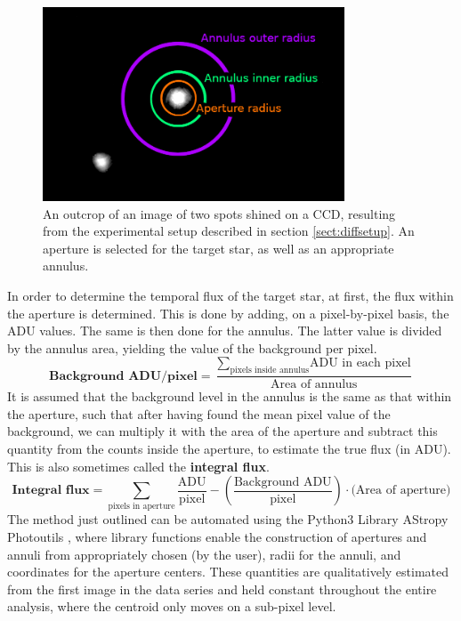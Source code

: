 \documentclass[../main.tex]{subfiles}
\begin{document}
\begin{figure}[h!]
	\centering
	\includegraphics[width	=0.8\textwidth]{aperturespots.png}
	\caption{An outcrop of an image of two spots shined on a CCD, resulting from the experimental setup described in section \ref{sect:diffsetup}. An aperture is selected for the target star, as well as an appropriate annulus.}
	\label{fig:aperture}
\end{figure}

In order to determine the temporal flux of the target star, at first, the flux within the aperture is determined. This is done by adding, on a pixel-by-pixel basis, the ADU values. The same is then done for the annulus. The latter value is divided by the annulus area, yielding the value of the background per pixel. 
\begin{equation}
	\textbf{Background ADU/pixel} = \frac{\sum_\text{pixels inside annulus} \text{ADU in each pixel}}{\text{Area of annulus}}
\end{equation}
It is assumed that the background level in the annulus is the same as that within the aperture, such that after having found the mean pixel value of the background, we can multiply it with the area of the aperture and subtract this quantity from the counts inside the aperture, to estimate the true flux (in ADU). This is also sometimes called the \textbf{integral flux}.
\begin{equation}
	\textbf{Integral flux} = \sum_\text{pixels in aperture} \frac{\text{ADU}}{\text{pixel}} - \left(\frac{\text{Background ADU}}{\text{pixel}}\right) \cdot \text{(Area of aperture)}
\end{equation}
The method just outlined can be automated using the Python3 Library AStropy Photoutils \cite{larry_bradley_2020_4044744}, where library functions enable the construction of apertures and annuli from appropriately chosen (by the user), radii for the annuli, and coordinates for the aperture centers. These quantities are qualitatively estimated from the first image in the data series and held constant throughout the entire analysis, where the centroid only moves on a sub-pixel level.
\end{document}
